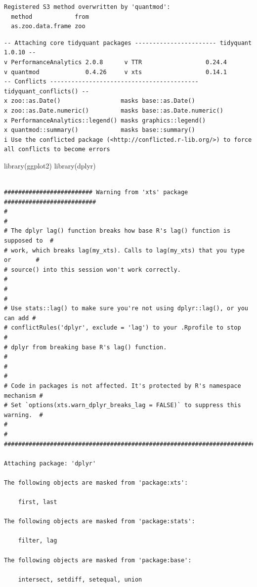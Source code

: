 \documentclass[
  letterpaper,
  DIV=11,
  numbers=noendperiod]{scrartcl}
\newenvironment{Shaded}{\begin{snugshade}}{\end{snugshade}}
\newcommand{\FunctionTok}[1]{\textcolor[rgb]{0.28,0.35,0.67}{#1}}
\newcommand{\NormalTok}[1]{\textcolor[rgb]{0.00,0.23,0.31}{#1}}
\begin{document}
\begin{verbatim}
Registered S3 method overwritten by 'quantmod':
  method            from
  as.zoo.data.frame zoo 
\end{verbatim}

\begin{verbatim}
-- Attaching core tidyquant packages ----------------------- tidyquant 1.0.10 --
v PerformanceAnalytics 2.0.8      v TTR                  0.24.4
v quantmod             0.4.26     v xts                  0.14.1
-- Conflicts ------------------------------------------ tidyquant_conflicts() --
x zoo::as.Date()                 masks base::as.Date()
x zoo::as.Date.numeric()         masks base::as.Date.numeric()
x PerformanceAnalytics::legend() masks graphics::legend()
x quantmod::summary()            masks base::summary()
i Use the conflicted package (<http://conflicted.r-lib.org/>) to force all conflicts to become errors
\end{verbatim}

\begin{Shaded}
\begin{Highlighting}[]
\FunctionTok{library}\NormalTok{(ggplot2)}
\FunctionTok{library}\NormalTok{(dplyr)}
\end{Highlighting}
\end{Shaded}

\begin{verbatim}

######################### Warning from 'xts' package ##########################
#                                                                             #
# The dplyr lag() function breaks how base R's lag() function is supposed to  #
# work, which breaks lag(my_xts). Calls to lag(my_xts) that you type or       #
# source() into this session won't work correctly.                            #
#                                                                             #
# Use stats::lag() to make sure you're not using dplyr::lag(), or you can add #
# conflictRules('dplyr', exclude = 'lag') to your .Rprofile to stop           #
# dplyr from breaking base R's lag() function.                                #
#                                                                             #
# Code in packages is not affected. It's protected by R's namespace mechanism #
# Set `options(xts.warn_dplyr_breaks_lag = FALSE)` to suppress this warning.  #
#                                                                             #
###############################################################################

Attaching package: 'dplyr'

The following objects are masked from 'package:xts':

    first, last

The following objects are masked from 'package:stats':

    filter, lag

The following objects are masked from 'package:base':

    intersect, setdiff, setequal, union
\end{verbatim}
\end{document}
